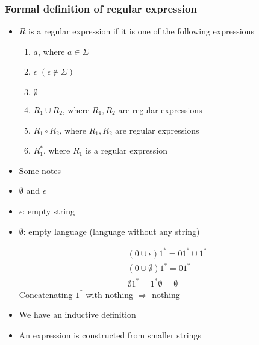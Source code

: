 \begin{frame}[allowframebreaks] \frametitle{Formal definition of regular expression}
\begin{itemize}
\item $R$ is a regular expression if it is one of the following
expressions
\begin{enumerate}
\item $a$, where $a \in \Sigma$
\item $\epsilon$ $(\epsilon \notin \Sigma)$
\item $\emptyset$
\item $R_1 \cup R_2$,  where $R_1, R_2$ are regular expressions
\item $R_1 \circ R_2$, where $R_1, R_2$ are regular expressions
\item $R_1^*$,  where $R_1$ is a regular expression
\end{enumerate}
\item  Some notes
\item $\emptyset$ and $\epsilon$

\item  [] $\epsilon$: empty string

\item []  $\emptyset$: empty language (language without any string)

  \begin{equation*}
    \begin{split}
&(0 \cup \epsilon)1^*=01^* \cup 1^* \\
&(0 \cup \emptyset)1^*=01^* \\
&\emptyset 1^* = 1^* \emptyset = \emptyset
\end{split}
\end{equation*}
Concatenating $1^*$ with nothing $\Rightarrow$ nothing

\item We have an inductive definition

\item [] An expression is constructed from smaller strings

\end{itemize}\end{frame}

